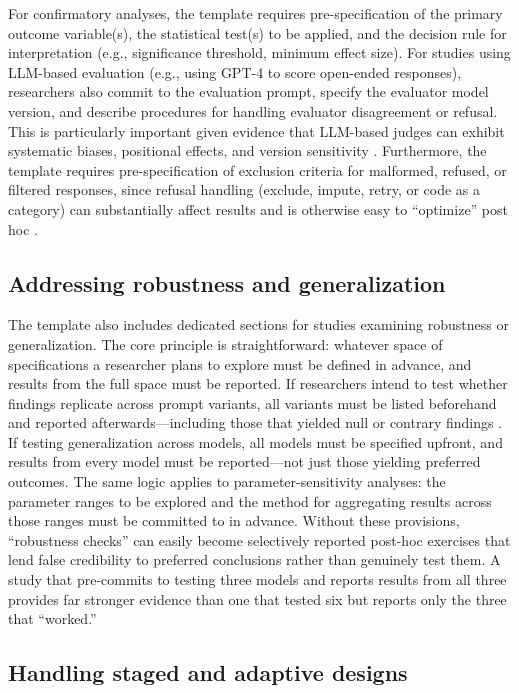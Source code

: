 \documentclass{article}
\theoremstyle{plain}
\theoremstyle{definition}
\theoremstyle{remark}
\begin{document}
For confirmatory analyses, the template requires pre-specification of the primary outcome variable(s), the statistical test(s) to be applied, and the decision rule for interpretation (e.g., significance threshold, minimum effect size). For studies using LLM-based evaluation (e.g., using GPT-4 to score open-ended responses), researchers also commit to the evaluation prompt, specify the evaluator model version, and describe procedures for handling evaluator disagreement or refusal. This is particularly important given evidence that LLM-based judges can exhibit systematic biases, positional effects, and version sensitivity \citep{zheng2023judgingllm}. Furthermore, the template requires pre-specification of exclusion criteria for malformed, refused, or filtered responses, since refusal handling (exclude, impute, retry, or code as a category) can substantially affect results and is otherwise easy to ``optimize'' post hoc \citep{simmons2011falsepositive,gelman2013forkingpaths}.

\subsection{Addressing robustness and generalization}

The template also includes dedicated sections for studies examining robustness or generalization. The core principle is straightforward: whatever space of specifications a researcher plans to explore must be defined in advance, and results from the full space must be reported. If researchers intend to test whether findings replicate across prompt variants, all variants must be listed beforehand and reported afterwards---including those that yielded null or contrary findings \citep{steegen2016multiverse}. If testing generalization across models, all models must be specified upfront, and results from every model must be reported---not just those yielding preferred outcomes. The same logic applies to parameter-sensitivity analyses: the parameter ranges to be explored and the method for aggregating results across those ranges must be committed to in advance. Without these provisions, ``robustness checks'' can easily become selectively reported post-hoc exercises that lend false credibility to preferred conclusions rather than genuinely test them. A study that pre-commits to testing three models and reports results from all three provides far stronger evidence than one that tested six but reports only the three that ``worked.''

\subsection{Handling staged and adaptive designs}
\end{document}
